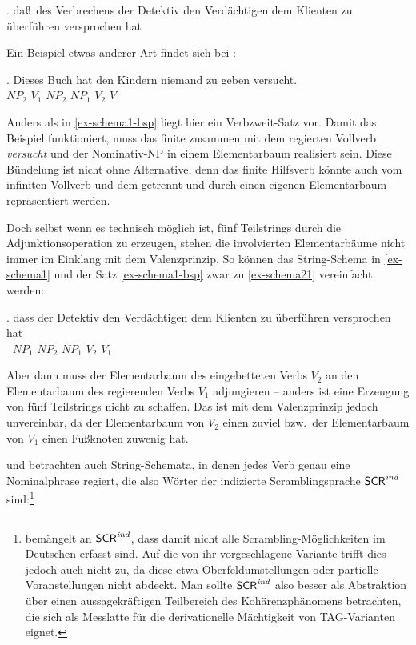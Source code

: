 \ex. da\ss \ des Verbrechens der Detektiv den Verdächtigen dem Klienten zu überführen versprochen hat \hfill\label{ex-schema1-bsp}\mbox{\citep[(2b)]{Becker:Joshi:Rambow:91}}

Ein Beispiel etwas anderer Art findet sich bei \cite{Rambow:94}:

\exg. {Dieses Buch} hat {den Kindern} niemand {zu geben} versucht.  \\
$\mathit{NP}_2$ $V_1$ $\mathit{NP}_2$ $\mathit{NP}_1$ $V_2$ $V_1$ \\
\citep[42]{Rambow:94} \label{ex-schema2}

Anders als in \ref{ex-schema1-bsp} liegt hier ein Verbzweit-Satz vor. Damit das Beispiel funktioniert, muss das finite  zusammen mit dem regierten Vollverb {\it versucht} und der Nominativ-NP in einem Elementarbaum realisiert sein. Diese Bündelung ist nicht ohne Alternative, denn das finite Hilfsverb könnte auch vom infiniten Vollverb und dem  getrennt und durch einen eigenen Elementarbaum repräsentiert werden. 

Doch selbst wenn es technisch möglich ist, fünf Teilstrings durch die Adjunktionsoperation zu erzeugen, stehen die involvierten Elementarbäume nicht immer im Einklang mit dem Valenzprinzip. So können das String-Schema in \ref{ex-schema1} und der Satz \ref{ex-schema1-bsp} zwar zu \ref{ex-schema21} vereinfacht werden: 

\exg. dass {der Detektiv} {den Verdächtigen} {dem Klienten} {zu überführen} {versprochen hat}  \\
$~$ $\mathit{NP}_1$ $\mathit{NP}_2$ $\mathit{NP}_1$ $V_2$ $V_1$ \\
\label{ex-schema21}

Aber dann muss der Elementarbaum des eingebetteten Verbs $V_2$ an den Elementarbaum des regierenden Verbs $V_1$ adjungieren -- anders ist eine Erzeugung von fünf Teilstrings nicht zu schaffen. Das ist mit dem Valenzprinzip jedoch unvereinbar, da der Elementarbaum von $V_2$ einen  zuviel bzw.\ der Elementarbaum von $V_1$ einen Fu\ss knoten zuwenig hat.  %

\cite{Becker:Joshi:Rambow:91} und \cite{Joshi:Becker:Rambow:00} betrachten auch String-Schemata, in denen jedes Verb genau eine Nominalphrase regiert, die also Wörter der indizierte Scramblingsprache $\mathsf{SCR}^{\mathit{ind}}$ sind:\footnote{\citet[200]{Kallmeyer:05} bemängelt an  $\mathsf{SCR}^{\mathit{ind}}$, dass damit nicht alle Scrambling-Möglichkeiten im Deutschen erfasst sind. Auf die von ihr vorgeschlagene Variante trifft dies jedoch auch nicht zu, da diese etwa Oberfeldumstellungen oder partielle Voranstellungen nicht abdeckt. Man sollte $\mathsf{SCR}^{\mathit{ind}}$ also besser als Abstraktion über einen aussagekräftigen Teilbereich des Kohärenzphänomens betrachten, die sich als Messlatte für die derivationelle Mächtigkeit von TAG-Varianten eignet.}

